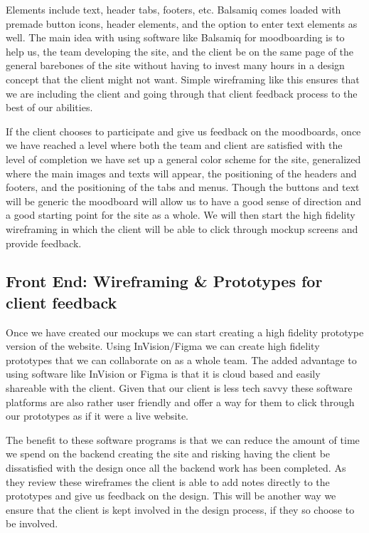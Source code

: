 \documentclass[10pt, a4paper, technote, draftclsnofoot,onecolumn ]{IEEEtran}
\begin{document}
Elements include text, header tabs, footers, etc. Balsamiq comes loaded with premade button icons, header elements, and the option to enter text elements as well. The main idea with using software like Balsamiq for moodboarding is to help us, the team developing the site, and the client be on the same page of the general barebones of the site without having to invest many hours in a design concept that the client might not want. Simple wireframing like this ensures that we are including the client and going through that client feedback process to the best of our abilities.

If the client chooses to participate and give us feedback on the moodboards, once we have reached a level where both the team and client are satisfied with the level of completion we have set up a general color scheme for the site, generalized where the main images and texts will appear, the positioning of the headers and footers, and the positioning of the tabs and menus. Though the buttons and text will be generic the moodboard will allow us to have a good sense of direction and a good starting point for the site as a whole. We will then start the high fidelity wireframing in which the client will be able to click through mockup screens and provide feedback.


\subsection{Front End: Wireframing & Prototypes for client feedback}

Once we have created our mockups we can start creating a high fidelity prototype version of the website. Using InVision/Figma we can create high fidelity prototypes that we can collaborate on as a whole team. The added advantage to using software like InVision or Figma is that it is cloud based and easily shareable with the client. Given that our client is less tech savvy these software platforms are also rather user friendly and offer a way for them to click through our prototypes as if it were a live website. 

The benefit to these software programs is that we can reduce the amount of time we spend on the backend creating the site and risking having the client be dissatisfied with the design once all the backend work has been completed. As they review these wireframes the client is able to add notes directly to the prototypes and give us feedback on the design. This will be another way we ensure that the client is kept involved in the design process, if they so choose to be involved.
\end{document}

